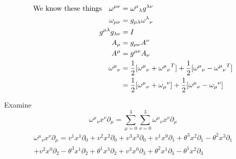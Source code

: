 \documentclass{article}
\begin{document}
\begin{align*}
	\qq*{We know these things}\omega^{\mu\nu} & ={\omega^\mu}_\lambda g^{\lambda\nu}                                                                   \\
	\omega_{\mu\nu}                           & = g_{\mu\lambda} {\omega^\lambda}_\nu                                                                  \\
	g^{\mu\lambda}g_{\lambda\nu}              & = I                                                                                                    \\
	A_\mu                                     & =g_{\mu\nu}A^\nu                                                                                       \\
	A^\mu                                     & =g^{\mu\nu}A_\nu                                                                                       \\
	{\omega^\mu}_\nu                          & =\frac{1}{2}[{\omega^\mu}_\nu+{{\omega^\mu}_\nu}^T]+\frac{1}{2}[{\omega^\mu}_\nu-{{\omega^\mu}_\nu}^T] \\
	                                          & =\frac{1}{2}[{\omega^\mu}_\nu+{\omega_\mu}^\nu]+\frac{1}{2}[{\omega^\mu}_\nu-{\omega_\mu}^\nu]
\end{align*}




Examine \[{\omega^\mu}_\nu x^\nu \partial_\mu=\sum^3_{\mu=0}\sum^3_{\nu=0}{\omega^\mu}_\nu x^\nu \partial_\mu\]
\begin{multline*}
	{\omega^\mu}_\nu x^\nu \partial_\mu=
	v^1 x^1 \partial_0+v^2 x^2 \partial_0+v^3 x^3 \partial_0+
	v^1 x^0 \partial_1+\theta^3 x^2 \partial_1-\theta^2 x^3 \partial_1\\+ 
	v^2 x^0 \partial_2-\theta^3 x^1 \partial_2+\theta^1 x^3 \partial_2+
	v^3 x^0 \partial_3+\theta^2 x^1 \partial_3-\theta^1 x^2 \partial_3
\end{multline*}
\end{document}
